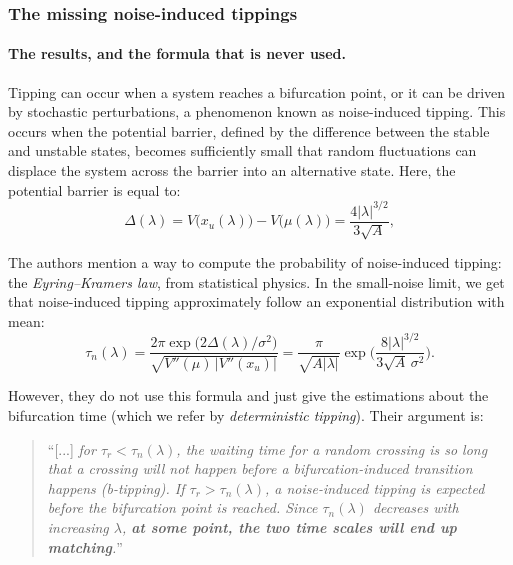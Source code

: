 \documentclass[12pt,a4paper]{article}
\theoremstyle{definition}
\theoremstyle{plain}
\begin{document}
\subsubsection{The missing noise-induced tippings}

\paragraph{The results, and the formula that is never used.}


Tipping can occur when a system reaches a bifurcation point, or it can be driven by stochastic perturbations, a phenomenon known as noise-induced tipping. This occurs when the potential barrier, defined by the difference between the stable and unstable states, becomes sufficiently small that random fluctuations can displace the system across the barrier into an alternative state. Here, the potential barrier is equal to: 
\begin{equation}
\label{eq:barrier}
\Delta(\lambda)=V\big(x_u(\lambda)\big)-V\big(\mu(\lambda)\big)=\frac{4|\lambda|^{3/2}}{3\sqrt{A}},
\end{equation}


\noindent The authors mention a way to compute the probability of noise-induced tipping: the \emph{Eyring--Kramers law}, from statistical physics. In the small-noise limit, we get that noise-induced tipping approximately follow an exponential distribution with mean:
\begin{equation}
\label{eq:ek}
\tau_n(\lambda)=\frac{2\pi\exp\big(2\Delta(\lambda)/\sigma^2\big)}
{\sqrt{V''(\mu)\,|V''(x_u)|}}
=\frac{\pi}{\sqrt{A|\lambda|}}\exp\!\Big(\frac{8|\lambda|^{3/2}}{3\sqrt{A}\,\sigma^2}\Big).
\end{equation}

\noindent However, they do not use this formula and just give the estimations about the bifurcation time (which we refer by \emph{deterministic tipping}). Their argument is: 

\begin{quote}
``[...] \textit{for $\tau_r < \tau_n(\lambda)$, the waiting time for a random crossing is so long that a crossing will not happen before a bifurcation-induced transition happens (b-tipping). If $\tau_r > \tau_n(\lambda)$, a noise-induced tipping is expected before the bifurcation point is reached. Since $\tau_n(\lambda)$ decreases with increasing $\lambda$, \textbf{at some point, the two time scales will end up matching}.}''
\end{quote}
\end{document}
